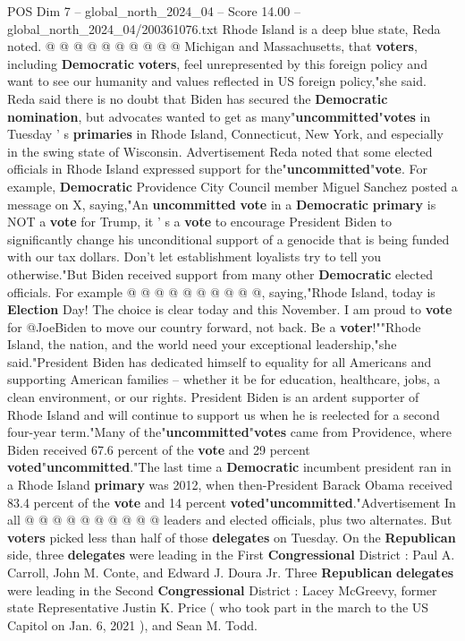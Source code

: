 \begin{textsample}{POS Dim 7 – global\_north\_2024\_04 – Score 14.00 – global\_north\_2024\_04/200361076.txt}
Rhode Island is a deep blue state, Reda noted. @ @ @ @ @ @ @ @ @ @ Michigan and Massachusetts, that \textbf{voters}, including \textbf{Democratic} \textbf{voters}, feel unrepresented by this foreign policy and want to see our humanity and values reflected in US foreign policy,"she said.
Reda said there is no doubt that Biden has secured the \textbf{Democratic} \textbf{nomination}, but advocates wanted to get as many"\textbf{uncommitted}"\textbf{votes} in Tuesday ' s \textbf{primaries} in Rhode Island, Connecticut, New York, and especially in the swing state of Wisconsin.
Advertisement Reda noted that some elected officials in Rhode Island expressed support for the"\textbf{uncommitted}"\textbf{vote}.
For example, \textbf{Democratic} Providence City Council member Miguel Sanchez posted a message on X, saying,"An \textbf{uncommitted} \textbf{vote} in a \textbf{Democratic} \textbf{primary} is NOT a \textbf{vote} for Trump, it ' s a \textbf{vote} to encourage President Biden to significantly change his unconditional support of a genocide that is being funded with our tax dollars.
Don't let establishment loyalists try to tell you otherwise."But Biden received support from many other \textbf{Democratic} elected officials.
For example @ @ @ @ @ @ @ @ @ @, saying,"Rhode Island, today is \textbf{Election} Day!
The choice is clear today and this November.
I am proud to \textbf{vote} for @JoeBiden to move our country forward, not back.
Be a \textbf{voter}!""Rhode Island, the nation, and the world need your exceptional leadership,"she said."President Biden has dedicated himself to equality for all Americans and supporting American families -- whether it be for education, healthcare, jobs, a clean environment, or our rights.
President Biden is an ardent supporter of Rhode Island and will continue to support us when he is reelected for a second four-year term."Many of the"\textbf{uncommitted}"\textbf{votes} came from Providence, where Biden received 67.6 percent of the \textbf{vote} and 29 percent \textbf{voted}"\textbf{uncommitted}."The last time a \textbf{Democratic} incumbent president ran in a Rhode Island \textbf{primary} was 2012, when then-President Barack Obama received 83.4 percent of the \textbf{vote} and 14 percent \textbf{voted}"\textbf{uncommitted}."Advertisement In all @ @ @ @ @ @ @ @ @ @ leaders and elected officials, plus two alternates.
But \textbf{voters} picked less than half of those \textbf{delegates} on Tuesday.
On the \textbf{Republican} side, three \textbf{delegates} were leading in the First \textbf{Congressional} District : Paul A.
Carroll, John M.
Conte, and Edward J.
Doura Jr.
Three \textbf{Republican} \textbf{delegates} were leading in the Second \textbf{Congressional} District : Lacey McGreevy, former state Representative Justin K.
Price ( who took part in the march to the US Capitol on Jan. 6, 2021 ), and Sean M.
Todd.

\end{textsample}
